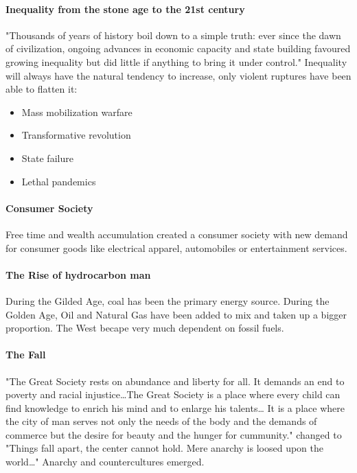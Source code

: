 \paragraph{Inequality from the stone age to the 21st century}

"Thousands of years of history boil down to a simple truth: ever since the
dawn of civilization, ongoing advances in economic capacity and state
building favoured growing inequality but did little if anything to bring
it under control." Inequality will always have the natural tendency to increase,
only violent ruptures have been able to flatten it:

\begin{itemize}
    \item Mass mobilization warfare
    \item Transformative revolution
    \item State failure
    \item Lethal pandemics
\end{itemize}

\paragraph{Consumer Society}
Free time and wealth accumulation created a consumer society with new demand
for consumer goods like electrical apparel, automobiles or entertainment
services.

\paragraph{The Rise of hydrocarbon man}
During the Gilded Age, coal has been the primary energy source. During the
Golden Age, Oil and Natural Gas have been added to mix and taken up a bigger
proportion. The West becape very much dependent on fossil fuels.

\paragraph{The Fall}

"The Great Society rests on abundance and liberty for all. It demands an end
to poverty and racial injustice\dots The Great Society is a place where every
child can find knowledge to enrich his mind and to enlarge his talents\dots
It is a place where the city of man serves not only the needs of the body and
the demands of commerce but the desire for beauty and the hunger for cummunity."
changed to "Things fall apart, the center cannot hold. Mere anarchy is loosed
upon the world\dots" Anarchy and countercultures emerged.


